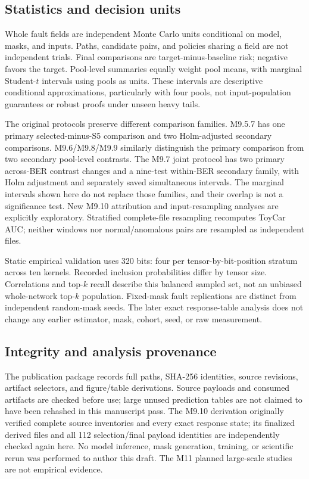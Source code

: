 \subsection{Statistics and decision units}
Whole fault fields are independent Monte Carlo units conditional on model, masks, and inputs. Paths, candidate pairs, and policies sharing a field are not independent trials. Final comparisons are target-minus-baseline risk; negative favors the target. Pool-level summaries equally weight pool means, with marginal Student-$t$ intervals using pools as units. These intervals are descriptive conditional approximations, particularly with four pools, not input-population guarantees or robust proofs under unseen heavy tails.

The original protocols preserve different comparison families. M9.5.7 has one primary selected-minus-S5 comparison and two Holm-adjusted secondary comparisons. M9.6/M9.8/M9.9 similarly distinguish the primary comparison from two secondary pool-level contrasts. The M9.7 joint protocol has two primary across-BER contrast changes and a nine-test within-BER secondary family, with Holm adjustment and separately saved simultaneous intervals. The marginal intervals shown here do not replace those families, and their overlap is not a significance test. New M9.10 attribution and input-resampling analyses are explicitly exploratory. Stratified complete-file resampling recomputes ToyCar AUC; neither windows nor normal/anomalous pairs are resampled as independent files.

Static empirical validation uses 320 bits: four per tensor-by-bit-position stratum across ten kernels. Recorded inclusion probabilities differ by tensor size. Correlations and top-$k$ recall describe this balanced sampled set, not an unbiased whole-network top-$k$ population. Fixed-mask fault replications are distinct from independent random-mask seeds. The later exact response-table analysis does not change any earlier estimator, mask, cohort, seed, or raw measurement.

\subsection{Integrity and analysis provenance}
The publication package records full paths, SHA-256 identities, source revisions, artifact selectors, and figure/table derivations. Source payloads and consumed artifacts are checked before use; large unused prediction tables are not claimed to have been rehashed in this manuscript pass. The M9.10 derivation originally verified complete source inventories and every exact response state; its finalized derived files and all 112 selection/final payload identities are independently checked again here. No model inference, mask generation, training, or scientific rerun was performed to author this draft. The M11 planned large-scale studies are not empirical evidence.
